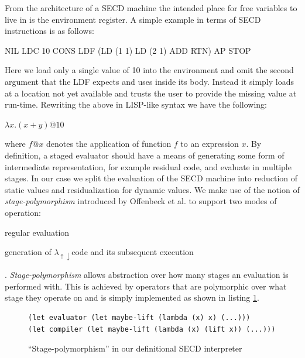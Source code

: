 \documentclass[fleqn]{article}
\theoremstyle{definition}
\newcommand{\mslang}{$\lambda_{\uparrow\downarrow}$}
\begin{document}
From the architecture of a SECD machine the intended place for free variables to live in is the environment register. A simple example in terms of SECD instructions is as follows:

NIL LDC 10 CONS LDF (LD (1 1) LD (2 1) ADD RTN) AP STOP

Here we load only a single value of 10 into the environment and omit the second argument that the LDF expects and uses inside its body. Instead it simply loads at a location not yet available and trusts the user to provide the missing value at run-time. Rewriting the above in LISP-like syntax we have the following:

$\lambda x.(x + y)@10$

where $f@x$ denotes the application of function $f$ to an expression $x$. By definition, a staged evaluator should have a means of generating some form of intermediate representation, for example residual code, and evaluate in multiple stages. In our case we split the evaluation of the SECD machine into reduction of static values and residualization for dynamic values. We make use of the notion of \textit{stage-polymorphism} introduced by Offenbeck et al. \cite{ofenbeck2017staging} to support two modes of operation:
\begin{enumerate*}[label=(\arabic*)]
	\item regular evaluation
	\item generation of \mslang code and its subsequent execution
\end{enumerate*}.
\textit{Stage-polymorphism} allows abstraction over how many stages an evaluation is performed with. This is achieved by operators that are polymorphic over what stage they operate on and is simply implemented as shown in listing \ref{lst:stage_poly_ex}.

\begin{figure}[h]
\centering
\begin{verbatim}
(let evaluator (let maybe-lift (lambda (x) x) (...)))
(let compiler (let maybe-lift (lambda (x) (lift x)) (...)))
\end{verbatim}
\caption{``Stage-polymorphism'' \cite{amin2017collapsing} in our definitional SECD interpreter}
\label{lst:stage_poly_ex}
\end{figure}
\end{document}

